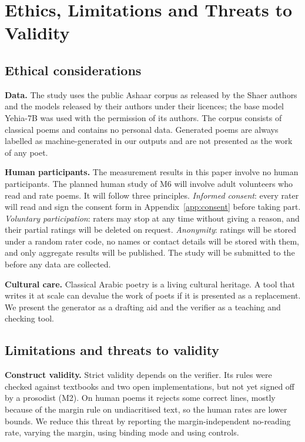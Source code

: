 \section{Ethics, Limitations and Threats to Validity}
\label{sec:ethics}

\subsection{Ethical considerations}
\textbf{Data.} The study uses the public Ashaar corpus as released by the Shaer authors and the models released by
their authors under their licences; the base model Yehia-7B was used with the permission of its authors. The corpus
consists of classical poems and contains no personal data. Generated poems are always labelled as machine-generated in
our outputs and are not presented as the work of any poet.

\textbf{Human participants.} The measurement results in this paper involve no human participants. The planned human
study of M6 will involve adult volunteers who read and rate poems. It will follow three principles. \emph{Informed
consent}: every rater will read and sign the consent form in Appendix~\ref{app:consent} before taking part.
\emph{Voluntary participation}: raters may stop at any time without giving a reason, and their partial ratings will be
deleted on request. \emph{Anonymity}: ratings will be stored under a random rater code, no names or contact details
will be stored with them, and only aggregate results will be published. The study will be submitted to the
 before any data are collected.

\textbf{Cultural care.} Classical Arabic poetry is a living cultural heritage. A tool that writes it at scale can
devalue the work of poets if it is presented as a replacement. We present the generator as a drafting aid and the
verifier as a teaching and checking tool.

\subsection{Limitations and threats to validity}
\textbf{Construct validity.} Strict validity depends on the verifier. Its rules were checked against textbooks and
two open implementations, but not yet signed off by a prosodist (M2). On human poems it rejects some correct lines,
mostly because of the margin rule on undiacritised text, so the human rates are lower bounds. We reduce this threat by
reporting the margin-independent no-reading rate, varying the margin, using binding mode and using controls.

